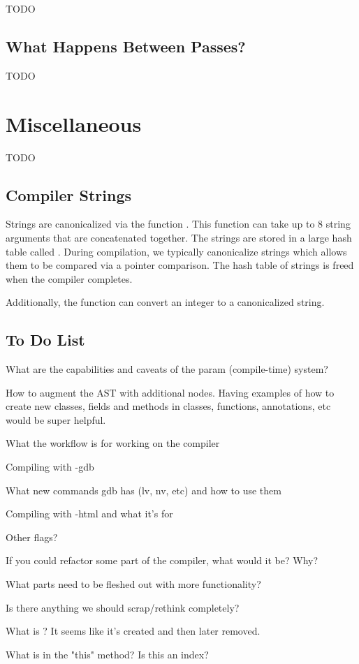 \documentclass[10pt]{article}
\begin{document}
TODO

\subsection{What Happens Between Passes?}
\label{sec:betweenpasses}

TODO

\section{Miscellaneous}
\label{sec:misc}

TODO

\subsection{Compiler Strings}
\label{sec:strings}

Strings are canonicalized via the function .  This function
can take up to 8 string arguments that are concatenated together.  The
strings are stored in a large hash table called
.  During compilation, we typically
canonicalize strings which allows them to be compared via a pointer
comparison.  The hash table of strings is freed when the compiler
completes.

Additionally, the function  can convert an integer to a
canonicalized string.

\subsection{To Do List}

What are the capabilities and caveats of the param (compile-time) system?

How to augment the AST with additional nodes.  Having examples of how
to create new classes, fields and methods in classes, functions,
annotations, etc would be super helpful.

What the workflow is for working on the compiler

Compiling with -gdb

What new commands gdb has (lv, nv, etc) and how to use them

Compiling with -html and what it's for

Other flags?

If you could refactor some part of the compiler, what would it be?  Why?

What parts need to be fleshed out with more functionality?

Is there anything we should scrap/rethink completely?


What is ?  It seems like it's created and then
later removed.

What is  in the "this" method?  Is this an index?
\end{document}
